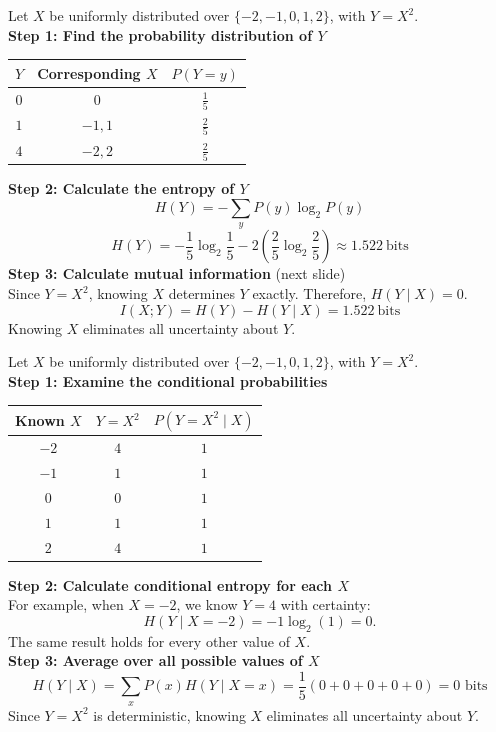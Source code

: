 \documentclass[aspectratio=43,11pt]{beamer}
\begin{document}
\begin{frame}[t]{}
\footnotesize
Let $X$ be uniformly distributed over
$\{-2,-1,0,1,2\}$, with $Y=X^2$.\\
\medskip
\textbf{Step 1: Find the probability distribution of $Y$}
\begin{center}
\begin{tabular}{ccc}
\toprule
$Y$ & Corresponding $X$ & $P(Y=y)$ \\
\midrule
$0$ & $0$      & $\frac15$ \\
$1$ & $-1,1$   & $\frac25$ \\
$4$ & $-2,2$   & $\frac25$ \\
\bottomrule
\end{tabular}
\end{center}
\textbf{Step 2: Calculate the entropy of $Y$}
\[
H(Y)=-\sum_y P(y)\log_2 P(y)
\]
\[
H(Y) =-\frac15\log_2\frac15 -2\left(\frac25\log_2\frac25\right) \approx 1.522\ \text{bits}
\]
\textbf{Step 3: Calculate mutual information} {\tiny (next slide)} \\ %
Since $Y=X^2$, knowing $X$ determines $Y$ exactly.
Therefore, $H(Y\mid X)=0$.
\[
\boxed{
I(X;Y)=H(Y)-H(Y\mid X)
      =1.522\ \text{bits}
}
\]
Knowing $X$ eliminates all uncertainty about $Y$.
\end{frame}

\begin{frame}[t]{}
\footnotesize
Let $X$ be uniformly distributed over $\{-2,-1,0,1,2\}$, with $Y=X^2$.\\
\smallskip
\textbf{Step 1: Examine the conditional probabilities}
\begin{center}
\begin{tabular}{ccc}
\toprule
Known $X$ & $Y=X^2$ & $P(Y=X^2\mid X)$ \\
\midrule
$-2$ & $4$ & $1$ \\
$-1$ & $1$ & $1$ \\
$0$  & $0$ & $1$ \\
$1$  & $1$ & $1$ \\
$2$  & $4$ & $1$ \\
\bottomrule
\end{tabular}
\end{center}
\smallskip
\textbf{Step 2: Calculate conditional entropy for each $X$}\\
For example, when $X=-2$, we know $Y=4$ with certainty:
\[
H(Y\mid X=-2)
=-1\log_2(1)=0.
\]
The same result holds for every other value of $X$.\\
\smallskip
\textbf{Step 3: Average over all possible values of $X$}
\[
H(Y\mid X) =\sum_x P(x)H(Y\mid X=x) =\frac15(0+0+0+0+0) = \boxed{0\text{ bits}}
\]
Since $Y=X^2$ is deterministic, knowing $X$ eliminates all uncertainty about $Y$.
\end{frame}
\end{document}
